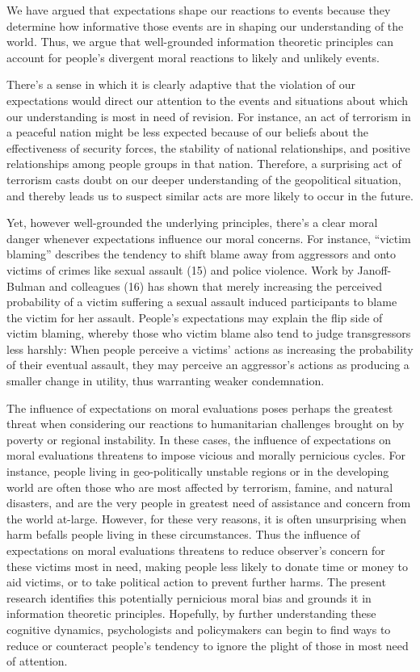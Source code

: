 \documentclass[9pt,twocolumn,twoside,lineno]{pnas-new}
\begin{document}
We have argued that expectations shape our reactions to events because
they determine how informative those events are in shaping our
understanding of the world. Thus, we argue that well-grounded
information theoretic principles can account for people's divergent
moral reactions to likely and unlikely events.

There's a sense in which it is clearly adaptive that the violation of
our expectations would direct our attention to the events and situations
about which our understanding is most in need of revision. For instance,
an act of terrorism in a peaceful nation might be less expected because
of our beliefs about the effectiveness of security forces, the stability
of national relationships, and positive relationships among people
groups in that nation. Therefore, a surprising act of terrorism casts
doubt on our deeper understanding of the geopolitical situation, and
thereby leads us to suspect similar acts are more likely to occur in the
future.

Yet, however well-grounded the underlying principles, there's a clear
moral danger whenever expectations influence our moral concerns. For
instance, ``victim blaming'' describes the tendency to shift blame away
from aggressors and onto victims of crimes like sexual assault (15) and
police violence. Work by Janoff-Bulman and colleagues (16) has shown
that merely increasing the perceived probability of a victim suffering a
sexual assault induced participants to blame the victim for her assault.
People's expectations may explain the flip side of victim blaming,
whereby those who victim blame also tend to judge transgressors less
harshly: When people perceive a victims' actions as increasing the
probability of their eventual assault, they may perceive an aggressor's
actions as producing a smaller change in utility, thus warranting weaker
condemnation.

The influence of expectations on moral evaluations poses perhaps the
greatest threat when considering our reactions to humanitarian
challenges brought on by poverty or regional instability. In these
cases, the influence of expectations on moral evaluations threatens to
impose vicious and morally pernicious cycles. For instance, people
living in geo-politically unstable regions or in the developing world
are often those who are most affected by terrorism, famine, and natural
disasters, and are the very people in greatest need of assistance and
concern from the world at-large. However, for these very reasons, it is
often unsurprising when harm befalls people living in these
circumstances. Thus the influence of expectations on moral evaluations
threatens to reduce observer's concern for these victims most in need,
making people less likely to donate time or money to aid victims, or to
take political action to prevent further harms. The present research
identifies this potentially pernicious moral bias and grounds it in
information theoretic principles. Hopefully, by further understanding
these cognitive dynamics, psychologists and policymakers can begin to
find ways to reduce or counteract people's tendency to ignore the plight
of those in most need of attention.
\end{document}
